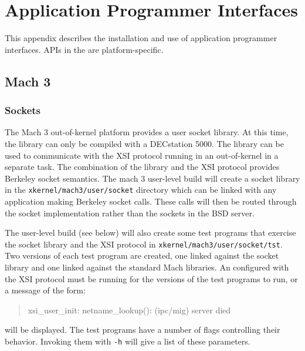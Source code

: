 % 
%
%
%
%
%

\section{Application Programmer Interfaces}
\label{api}

This appendix describes the installation and use of \xk{} application
programmer interfaces.  APIs in the \xk{} are platform-specific.


\subsection{ Mach 3 }

\subsubsection{Sockets}

The Mach 3 out-of-kernel platform provides a user socket library.
At this time, the library can only be compiled with a DECstation 5000. 
The library can be used to communicate with the XSI protocol
running in an out-of-kernel \xk{} in a separate task.
The combination of the library and the XSI protocol 
provides Berkeley socket semantics.  The mach 3 user-level build
will create a socket library in the {\tt xkernel/mach3/user/socket}
directory which can be linked with any application making Berkeley
socket calls.  These calls will then be routed through the \xk{}
socket implementation rather than the sockets in the BSD server.

The user-level build (see below) will also create some test programs 
that exercise the socket library
and the XSI protocol in {\tt xkernel/mach3/user/socket/tst}.  
Two versions of each test program are created,
one linked against the \xk{} socket library and one linked against the
standard Mach libraries.  An \xk{} configured with the XSI protocol
must be running for the \xk{} versions of the test programs to run, or
a message of the form:
\begin{quote}
\begin{tt}
xsi\_user\_init: netname\_lookup(): (ipc/mig) server died
\end{tt}
\end{quote}
will be displayed.  The test programs have a number of flags
controlling their behavior.  Invoking them with {\tt -h} will give a
list of these parameters.


